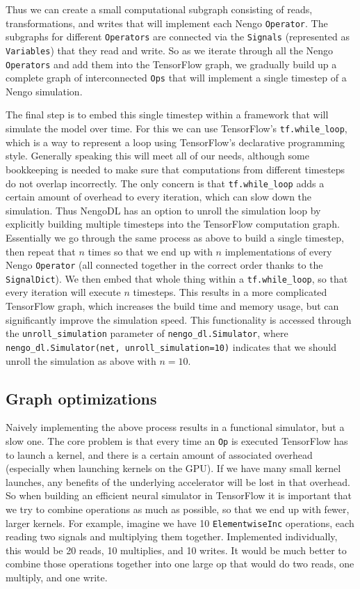 \documentclass{article}
\begin{document}
Thus we can create a small computational subgraph consisting of reads, transformations, and writes that will implement each Nengo \texttt{Operator}.  The subgraphs for different \texttt{Operators} are connected via the \texttt{Signals} (represented as \texttt{Variables}) that they read and write.  So as we iterate through all the Nengo \texttt{Operators} and add them into the TensorFlow graph, we gradually build up a complete graph of interconnected \texttt{Ops} that will implement a single timestep of a Nengo simulation.

The final step is to embed this single timestep within a framework that will simulate the model over time.  For this we can use TensorFlow's \texttt{tf.while\_loop}, which is a way to represent a loop using TensorFlow's declarative programming style.  Generally speaking this will meet all of our needs, although some bookkeeping is needed to make sure that computations from different timesteps do not overlap incorrectly.  The only concern is that \texttt{tf.while\_loop} adds a certain amount of overhead to every iteration, which can slow down the simulation.  Thus NengoDL has an option to unroll the simulation loop by explicitly building multiple timesteps into the TensorFlow computation graph.  Essentially we go through the same process as above to build a single timestep, then repeat that $n$ times so that we end up with $n$ implementations of every Nengo \texttt{Operator} (all connected together in the correct order thanks to the \texttt{SignalDict}).  We then embed that whole thing within a \texttt{tf.while\_loop}, so that every iteration will execute $n$ timesteps.  This results in a more complicated TensorFlow graph, which increases the build time and memory usage, but can significantly improve the simulation speed.  This functionality is accessed through the \texttt{unroll\_simulation} parameter of \texttt{nengo\_dl.Simulator}, where \texttt{nengo\_dl.Simulator(net, unroll\_simulation=10)} indicates that we should unroll the simulation as above with $n=10$.

\subsection{Graph optimizations}
\label{sec:graphoptimizations}

Naively implementing the above process results in a functional simulator, but a slow one.  The core problem is that every time an \texttt{Op} is executed TensorFlow has to launch a kernel, and there is a certain amount of associated overhead (especially when launching kernels on the GPU).  If we have many small kernel launches, any benefits of the underlying accelerator will be lost in that overhead.  So when building an efficient neural simulator in TensorFlow it is important that we try to combine operations as much as possible, so that we end up with fewer, larger kernels.  For example, imagine we have 10 \texttt{ElementwiseInc} operations, each reading two signals and multiplying them together.  Implemented individually, this would be 20 reads, 10 multiplies, and 10 writes.  It would be much better to combine those operations together into one large op that would do two reads, one multiply, and one write.
\end{document}
